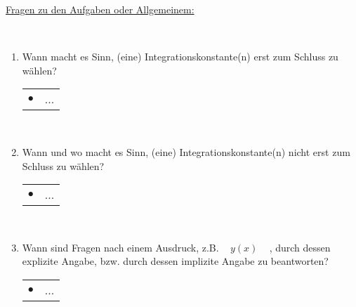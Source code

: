 


\newpage

\underline{Fragen zu den Aufgaben oder Allgemeinem:}

~\\

\begin{enumerate}
	
	\item Wann macht es Sinn, (eine) Integrationskonstante(n) erst zum Schluss zu wählen? \\
	
	\begin{tabularx}{0.88\textwidth}{lX}
		$\bullet$ & ...
	\end{tabularx}
	
	~\\
	
	\item Wann und wo macht es Sinn, (eine) Integrationskonstante(n) nicht erst zum Schluss zu wählen? \\
	
	\begin{tabularx}{0.88\textwidth}{lX}
		$\bullet$ & ...
	\end{tabularx}
	
	~\\
	
	\item Wann sind Fragen nach einem Ausdruck, z.B. ~ $y(x)$ ~ , durch dessen explizite Angabe, bzw. durch dessen implizite Angabe zu beantworten? \\
	
	\begin{tabularx}{0.88\textwidth}{lX}
		$\bullet$ & ...
	\end{tabularx}
	
\end{enumerate}	


\newpage


\chapter{~}
\section{~}

~\\


\begin{description}[leftmargin=*, labelsep=2em, itemsep=3em]
\item[a)]	
\end{description} \setcounter{tc}{0}


